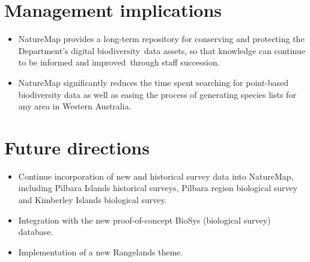 \documentclass[version=last,
    paper=a4, %
    10pt, %
    usenames,
    dvipsnames,
    oneside, %
    headings=openany, %
    DIV=15 %
]{scrbook}
\begin{document}
\section*{Management implications}
\begin{itemize}
\itemsep1pt\parskip0pt
\item
  NatureMap provides a long-term repository for conserving and
  protecting the Department's digital biodiversity~data assets, so that
  knowledge can continue to be informed and improved~through staff
  succession.
\item
  NatureMap significantly reduces the time spent searching for
  point-based biodiversity data as well as easing the process of
  generating species lists for any area in Western Australia.
\end{itemize}



\section*{Future directions}
\begin{itemize}
\itemsep1pt\parskip0pt
\item
  Continue incorporation of new and historical survey data into
  NatureMap, including Pilbara Islands historical surveys, Pilbara
  region biological survey and Kimberley Islands biological survey.
\item
  Integration with the new proof-of-concept BioSys (biological survey)
  database.
\item
  Implementation of a new Rangelands theme.
\end{itemize}



\end{document}
